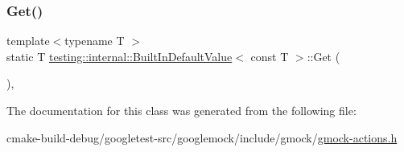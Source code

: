 \mbox{\label{classtesting_1_1internal_1_1BuiltInDefaultValue_3_01const_01T_01_4_a5996754952ecbcc5da77a2cebd4722de}} 
\subsubsection{\texorpdfstring{Get()}{Get()}}
{\footnotesize\ttfamily template$<$typename T $>$ \\
static T \mbox{\hyperlink{classtesting_1_1internal_1_1BuiltInDefaultValue}{testing\+::internal\+::\+Built\+In\+Default\+Value}}$<$ const T $>$\+::Get (\begin{DoxyParamCaption}{ }\end{DoxyParamCaption})\hspace{0.3cm}{\ttfamily [inline]}, {\ttfamily [static]}}



The documentation for this class was generated from the following file\+:\begin{DoxyCompactItemize}
\item 
cmake-\/build-\/debug/googletest-\/src/googlemock/include/gmock/\mbox{\hyperlink{gmock-actions_8h}{gmock-\/actions.\+h}}\end{DoxyCompactItemize}
